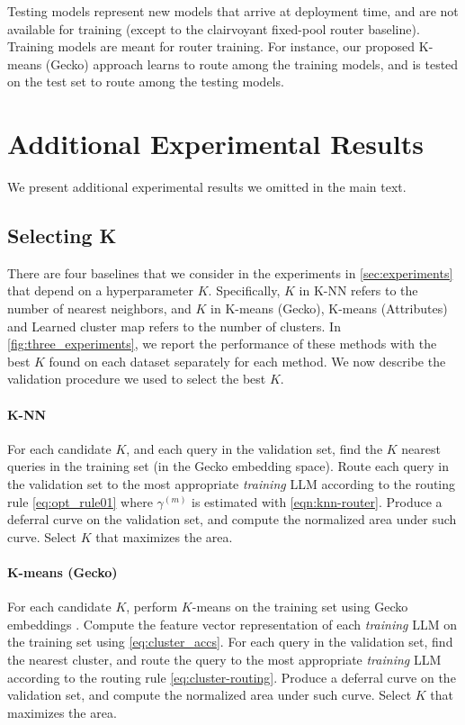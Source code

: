 Testing models represent new models that arrive at deployment time, and are not available for training (except to the clairvoyant fixed-pool router baseline).
Training models are meant for router training. For instance, our proposed K-means (Gecko) approach learns to route among the training models, and is tested on the test set to route among the testing models.







\section{Additional Experimental Results}
We present additional experimental results we omitted in the main text.

\subsection{Selecting K}
\label{sec:validate_k}
There are four baselines that we consider in the experiments in \cref{sec:experiments} that depend on a hyperparameter $K$.
Specifically, $K$ in K-NN refers to the number of nearest neighbors, and $K$ in K-means (Gecko), K-means (Attributes) and Learned cluster map refers to the number of clusters. In \cref{fig:three_experiments}, we report the performance of these methods with the best $K$ found on each dataset separately for each method.
We now describe the validation procedure we used to select the best $K$.

\paragraph{K-NN} 
For each candidate $K$, and each query in the validation set, find the $K$ nearest queries in the training set (in the Gecko embedding space). Route each query in the validation set to the most appropriate \emph{training} LLM according to the routing rule \eqref{eq:opt_rule01} where $\gamma^{(m)}$ is estimated with \eqref{eqn:knn-router}. Produce a deferral curve on the validation set, and compute the normalized area under such curve. Select $K$ that maximizes the area.

\paragraph{K-means (Gecko)} 
For each candidate $K$, perform $K$-means on the training set using Gecko embeddings \citep{LeeDaiRen2024}.
Compute the feature vector representation of each \emph{training} LLM on the training set using \eqref{eq:cluster_accs}. 
For each query in the validation set, find the nearest cluster, and route the query to the most appropriate \emph{training} LLM according to the routing rule \eqref{eq:cluster-routing}. Produce a deferral curve on the validation set, and compute the normalized area under such curve. Select $K$ that maximizes the area.

